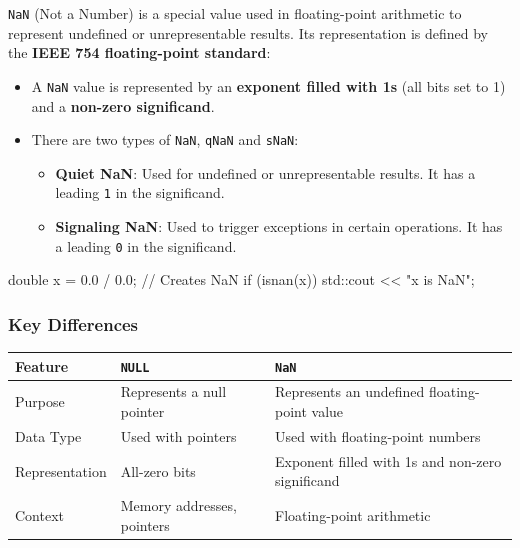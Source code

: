 \texttt{NaN} (Not a Number) is a special value used in floating-point arithmetic to represent undefined or unrepresentable results. Its representation is defined by the \textbf{IEEE 754 floating-point standard}:

\begin{itemize}
    \item A \texttt{NaN} value is represented by an \textbf{exponent filled with 1s} (all bits set to 1) and a \textbf{non-zero significand}.
    \item There are two types of \texttt{NaN}, \texttt{qNaN} and \texttt{sNaN}:
    \begin{itemize}
        \item \textbf{Quiet NaN}: Used for undefined or unrepresentable results. It has a leading \texttt{1} in the significand.
        \item \textbf{Signaling NaN}: Used to trigger exceptions in certain operations. It has a leading \texttt{0} in the significand.
    \end{itemize}
\end{itemize}
    
\begin{exampleblock}
    \begin{codeblock}[language=C++]
double x = 0.0 / 0.0; // Creates NaN
if (isnan(x)) {
    std::cout << "x is NaN\n";
}
    \end{codeblock}
\end{exampleblock}

\subsubsection{Key Differences}

\begin{tabular}{|l|l|l|}
    \hline
    \textbf{Feature} & \textbf{\texttt{NULL}} & \textbf{\texttt{NaN}} \\ \hline
    Purpose & Represents a null pointer & Represents an undefined floating-point value \\ \hline
    Data Type & Used with pointers & Used with floating-point numbers \\ \hline
    Representation & All-zero bits & Exponent filled with 1s and non-zero significand \\ \hline
    Context & Memory addresses, pointers & Floating-point arithmetic \\ \hline
\end{tabular}

